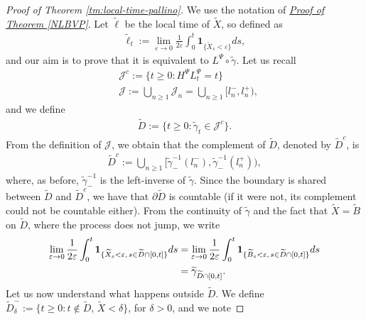 \documentclass[11pt,a4paper]{article}
\theoremstyle{definition}
\theoremstyle{remark}
\begin{document}
\begin{proof}[Proof of Theorem \ref{tm:local-time-pallino}]
	We use the notation of \hyperref[proof:NLBVP]{\textit{Proof of Theorem \ref{NLBVP}}}. Let \(\widetilde{\ell}\) be the local time of \(\widetilde{X}\), so defined as
	\begin{align*}
		\widetilde{\ell}_t := \lim_{\varepsilon \to 0}\frac{1}{2 \varepsilon} \int_0^t \mathbf{1}_{\{\widetilde{X}_s < \varepsilon\}} ds,
	\end{align*}
	and our aim is to prove that it is equivalent to \(L^\Psi \circ \widetilde{\gamma}\). Let us recall 
	\begin{align*}
		&\mathcal{J}^c:=\{t \geq 0 : H^\Psi L^\Psi_t = t\}\\
		&\mathcal{J} := \bigcup_{n \geq 1} \mathcal{J}_n= \bigcup_{n \geq 1} [l_n^{-}, l_n^+),
	\end{align*}
	and we define 
	\begin{align*}
		\widetilde{D}:= \{t \geq 0 : \widetilde{\gamma}_t \in \mathcal{J}^c\}.
	\end{align*}
	From the definition of $\mathcal{J}$, we obtain that the complement of \(\widetilde{D}\), denoted by \(\widetilde{D}^c\), is
	\begin{align*}
		\widetilde{D}^c:= \bigcup_{n \geq 1} [\widetilde{\gamma}^{-1}_{-}(l_n^{-}), \widetilde{\gamma}^{-1}_{-}(l_n^{+})),
	\end{align*}
	where, as before, \(\widetilde{\gamma}^{-1}_{-}\) is the left-inverse of \(\widetilde{\gamma}\). Since the boundary is shared between \(\widetilde{D}\) and \(\widetilde{D}^c\), we have that \(\partial \widetilde{D}\) is countable (if it were not, its complement could not be countable either). From the continuity of \(\widetilde{\gamma}\) and the fact that \(\widetilde{X}=\widetilde{B}\) on \(\widetilde{D}\), where the process does not jump, we write
	\begin{align}
		\label{pezzo+}
		\lim_{\varepsilon \to 0}\frac{1}{2 \varepsilon} \int_0^t \mathbf{1}_{\{\widetilde{X}_s < \varepsilon, \, s \in \widetilde{D} \cap [0,t]\}} ds &= \lim_{\varepsilon \to 0}\frac{1}{2 \varepsilon} \int_0^t \mathbf{1}_{\{\widetilde{B}_s < \varepsilon, \, s \in \widetilde{D} \cap [0,t]\}} ds \notag\\
		&= \widetilde{\gamma}_{\widetilde{D} \cap [0,t]}.
	\end{align}
	Let us now understand what happens outside \(\widetilde{D}\). We define \(\widetilde{D}_\delta^- := \{t \geq 0 : t \notin \widetilde{D}, \, \widetilde{X} < \delta\}\), for $\delta>0$, and we note

\end{proof}
\end{document}
